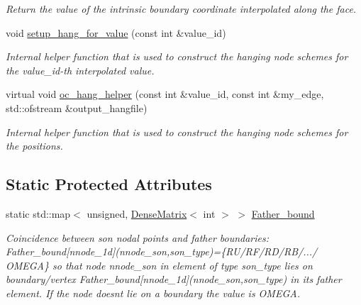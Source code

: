 \begin{DoxyCompactItemize}
\begin{DoxyCompactList}\small\item\em Return the value of the intrinsic boundary coordinate interpolated along the face. \end{DoxyCompactList}\item 
void \hyperlink{classoomph_1_1RefineableQElement_3_013_01_4_a3d38b1cfacb055140a330e3d251b601f}{setup\+\_\+hang\+\_\+for\+\_\+value} (const int \&value\+\_\+id)
\begin{DoxyCompactList}\small\item\em Internal helper function that is used to construct the hanging node schemes for the value\+\_\+id-\/th interpolated value. \end{DoxyCompactList}\item 
virtual void \hyperlink{classoomph_1_1RefineableQElement_3_013_01_4_abde04c6b8616bd2551b24ac1abade563}{oc\+\_\+hang\+\_\+helper} (const int \&value\+\_\+id, const int \&my\+\_\+edge, std\+::ofstream \&output\+\_\+hangfile)
\begin{DoxyCompactList}\small\item\em Internal helper function that is used to construct the hanging node schemes for the positions. \end{DoxyCompactList}\end{DoxyCompactItemize}
\subsection*{Static Protected Attributes}
\begin{DoxyCompactItemize}
\item 
static std\+::map$<$ unsigned, \hyperlink{classoomph_1_1DenseMatrix}{Dense\+Matrix}$<$ int $>$ $>$ \hyperlink{classoomph_1_1RefineableQElement_3_013_01_4_a0c02f69b5f451db97099acb1e2960738}{Father\+\_\+bound}
\begin{DoxyCompactList}\small\item\em Coincidence between son nodal points and father boundaries\+: Father\+\_\+bound\mbox{[}nnode\+\_\+1d\mbox{]}(nnode\+\_\+son,son\+\_\+type)=\{R\+U/\+R\+F/\+R\+D/\+R\+B/.../ O\+M\+E\+GA\} so that node nnode\+\_\+son in element of type son\+\_\+type lies on boundary/vertex Father\+\_\+bound\mbox{[}nnode\+\_\+1d\mbox{]}(nnode\+\_\+son,son\+\_\+type) in its father element. If the node doesn\textquotesingle{}t lie on a boundary the value is O\+M\+E\+GA. \end{DoxyCompactList}\end{DoxyCompactItemize}
